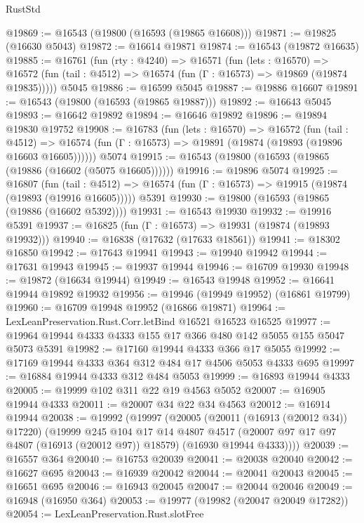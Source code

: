\begin{lexlean}{RustStd}
\begin{coremodule}
@19869 := @16543 (@19800 (@16593 (@19865 @16608)))
@19871 := @19825 (@16630 @5043)
@19872 := @16614 @19871
@19874 := @16543 (@19872 @16635)
@19885 := @16761
    (fun (rty : @4240) =>
    @16571
      (fun (lets : @16570) =>
      @16572 (fun (tail : @4512) => @16574 (fun (Γ : @16573) => @19869 (@19874 @19835)))))
    @5045
@19886 := @16599 @5045
@19887 := @19886 @16607
@19891 := @16543 (@19800 (@16593 (@19865 @19887)))
@19892 := @16643 @5045
@19893 := @16642 @19892
@19894 := @16646 @19892
@19896 := @19894 @19830 @19752
@19908 := @16783
    (fun (lets : @16570) =>
    @16572
      (fun (tail : @4512) =>
      @16574 (fun (Γ : @16573) => @19891 (@19874 (@19893 (@19896 @16603 @16605))))))
    @5074
@19915 := @16543 (@19800 (@16593 (@19865 (@19886 (@16602 (@5075 @16605))))))
@19916 := @19896 @5074
@19925 := @16807
    (fun (tail : @4512) => @16574 (fun (Γ : @16573) => @19915 (@19874 (@19893 (@19916 @16605)))))
    @5391
@19930 := @19800 (@16593 (@19865 (@19886 (@16602 @5392))))
@19931 := @16543 @19930
@19932 := @19916 @5391
@19937 := @16825 (fun (Γ : @16573) => @19931 (@19874 (@19893 @19932)))
@19940 := @16838 (@17632 (@17633 @18561))
@19941 := @18302 @16850
@19942 := @17643 @19941
@19943 := @19940 @19942
@19944 := @17631 @19943
@19945 := @19937 @19944
@19946 := @16709 @19930
@19948 := @19872 (@16634 @19944)
@19949 := @16543 @19948
@19952 := @16641 @19944 @19892 @19932
@19956 := @19946 (@19949 @19952) (@16861 @19799)
@19960 := @16709 @19948 @19952 (@16866 @19871)
@19964 := LexLeanPreservation.Rust.Corr.letBind @16521 @16523 @16525
@19977 := @19964 @19944 @4333 @4333 @155 @17 @366 @480 @142 @5055 @155 @5047 @5073 @5391
@19982 := @17160 @19944 @4333 @366 @17 @5055
@19992 := @17169 @19944 @4333 @364 @312 @484 @17 @4506 @5053 @4333 @695
@19997 := @16884 @19944 @4333 @312 @484 @5053
@19999 := @16893 @19944 @4333
@20005 := @19999 @102 @311 @22 @19 @4563 @5052
@20007 := @16905 @19944 @4333
@20011 := @20007 @34 @22 @34 @4563
@20012 := @16914 @19944
@20038 := @19992
    (@19997
      (@20005
        (@20011 (@16913 (@20012 @34)) @17220)
        (@19999
          @245
          @104
          @17
          @14
          @4807
          @4517
          (@20007 @97 @17 @97 @4807 (@16913 (@20012 @97)) @18579)
          (@16930 @19944 @4333))))
@20039 := @16557 @364
@20040 := @16753 @20039
@20041 := @20038 @20040
@20042 := @16627 @695
@20043 := @16939 @20042
@20044 := @20041 @20043
@20045 := @16651 @695
@20046 := @16943 @20045
@20047 := @20044 @20046
@20049 := @16948 (@16950 @364)
@20053 := @19977 (@19982 (@20047 @20049 @17282))
@20054 := LexLeanPreservation.Rust.slotFree

\end{coremodule}
\end{lexlean}
